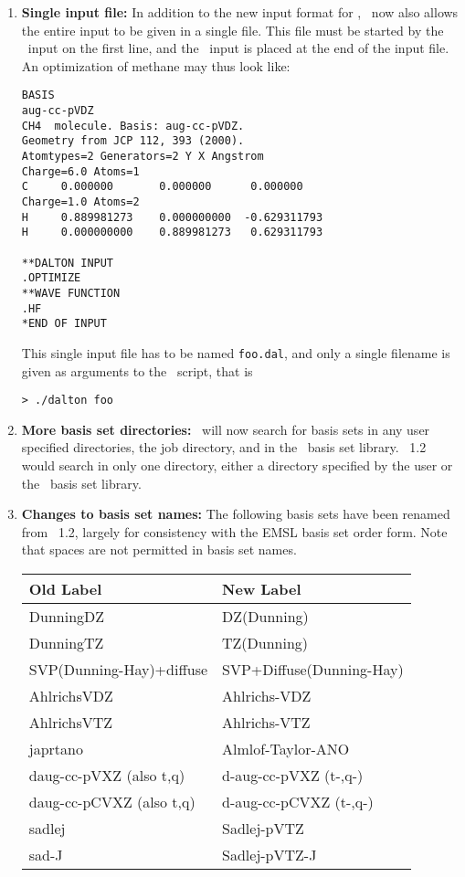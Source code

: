 \begin{enumerate}
\item{\bf Single input file:} In addition to the new input format for
  \dalton , \dalton\ now also allows the entire input to be given in a
  single file. This file must be started by the \mol\ input on the
  first line, and the \dalton\ input is placed at the end of the input
  file. An optimization of methane may thus look like:

\begin{verbatim}
BASIS
aug-cc-pVDZ
CH4  molecule. Basis: aug-cc-pVDZ.
Geometry from JCP 112, 393 (2000).
Atomtypes=2 Generators=2 Y X Angstrom
Charge=6.0 Atoms=1
C     0.000000       0.000000      0.000000
Charge=1.0 Atoms=2
H     0.889981273    0.000000000  -0.629311793
H     0.000000000    0.889981273   0.629311793

**DALTON INPUT
.OPTIMIZE
**WAVE FUNCTION
.HF
*END OF INPUT
\end{verbatim}
This single input file has to be named \verb|foo.dal|, and only a
single filename is given as arguments to the \dalton\ script, that is

\begin{verbatim}
> ./dalton foo
\end{verbatim}

\item{\bf More basis set directories:} \dalton\ will now search for basis sets
in any user specified directories, the job directory, and in the \dalton\ basis
set library. \dalton\ 1.2 would search in only one directory,
either a directory specified by the user
or the \dalton\ basis set library.

\item{\bf Changes to basis set names:} The following basis sets
have been renamed from \dalton\ 1.2, largely for consistency with the
EMSL basis set order form. Note that spaces are not
permitted in basis set names.
\begin{center}
\begin{tabular}{|l|l|}\hline
Old Label & New Label \\\hline
DunningDZ & DZ(Dunning)\\
DunningTZ & TZ(Dunning)\\
SVP(Dunning-Hay)+diffuse & SVP+Diffuse(Dunning-Hay) \\
AhlrichsVDZ & Ahlrichs-VDZ \\
AhlrichsVTZ & Ahlrichs-VTZ \\
japrtano & Almlof-Taylor-ANO \\
daug-cc-pVXZ (also t,q) & d-aug-cc-pVXZ (t-,q-)\\
daug-cc-pCVXZ (also t,q) & d-aug-cc-pCVXZ (t-,q-)\\
sadlej & Sadlej-pVTZ \\
sad-J & Sadlej-pVTZ-J \\
\hline
\end{tabular}
\end{center}


\end{enumerate}
